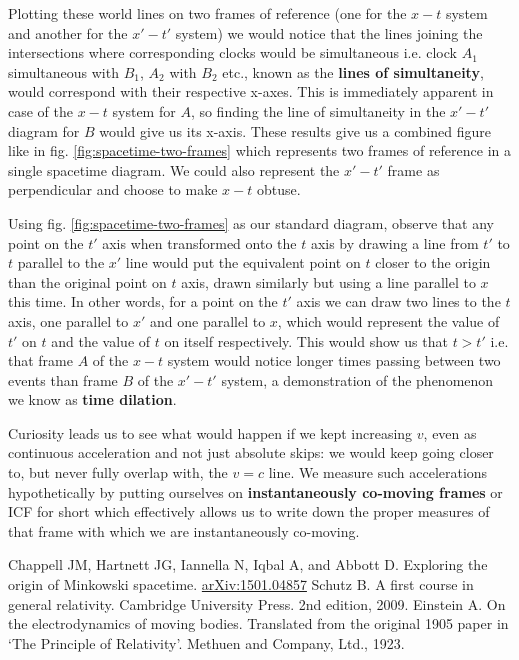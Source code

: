 \documentclass[english,seminar]{lecture}
\begin{document}
Plotting these world lines on two frames of reference (one for the $x-t$ system and another for the $x'-t'$ system) we would notice that the lines joining the intersections where corresponding clocks would be simultaneous i.e. clock $A_1$ simultaneous with $B_1$, $A_2$ with $B_2$ etc., known as the \textbf{lines of simultaneity}, would correspond with their respective x-axes. This is immediately apparent in case of the $x-t$ system for $A$, so finding the line of simultaneity in the $x'-t'$ diagram for $B$ would give us its x-axis. These results give us a combined figure like in fig. \ref{fig:spacetime-two-frames} which represents two frames of reference in a single spacetime diagram. We could also represent the $x'-t'$ frame as perpendicular and choose to make $x-t$ obtuse.

Using fig. \ref{fig:spacetime-two-frames} as our standard diagram, observe that any point on the $t'$ axis when transformed onto the $t$ axis by drawing a line from $t'$ to $t$ parallel to the $x'$ line would put the equivalent point on $t$ closer to the origin than the original point on $t$ axis, drawn similarly but using a line parallel to $x$ this time. In other words, for a point on the $t'$ axis we can draw two lines to the $t$ axis, one parallel to $x'$ and one parallel to $x$, which would represent the value of $t'$ on $t$ and the value of $t$ on itself respectively. This would show us that $t > t'$ i.e. that frame $A$ of the $x-t$ system would notice longer times passing between two events than frame $B$ of the $x'-t'$ system, a demonstration of the phenomenon we know as \textbf{time dilation}.

Curiosity leads us to see what would happen if we kept increasing $v$, even as continuous acceleration and not just absolute skips: we would keep going closer to, but never fully overlap with, the $v=c$ line. We measure such accelerations hypothetically by putting ourselves on \textbf{instantaneously co-moving frames} or ICF for short which effectively allows us to write down the proper measures of that frame with which we are instantaneously co-moving.

\begin{thebibliography}{99}
	Chappell JM, Hartnett JG, Iannella N, Iqbal A, and Abbott D. Exploring the origin of Minkowski spacetime. \href{https://arxiv.org/abs/1501.04857}{\ttfamily arXiv:1501.04857}
	Schutz B. A first course in general relativity. Cambridge University Press. 2nd edition, 2009.
	Einstein A. On the electrodynamics of moving bodies. Translated from the original 1905 paper in `The Principle of Relativity'. Methuen and Company, Ltd., 1923.
\end{thebibliography}
\end{document}
